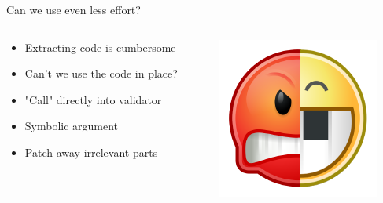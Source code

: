 \documentclass[10pt, compress, aspectratio=169]{beamer}
\begin{document}
\begin{frame}{Can we use even less effort?}

	\begin{columns}
		\begin{column}{0.6\textwidth}
	
		\begin{itemize}
		\item Extracting code is cumbersome
		\item Can't we use the code in place?
		\item "Call" directly into validator
		\item Symbolic argument
		\item Patch away irrelevant parts
		\end{itemize}
	\end{column}
		\begin{column}{0.4\textwidth}
			\includegraphics[width=\textwidth]{images/angr-logo.png}
		\end{column}
	\end{columns}	

\end{frame}
\end{document}
